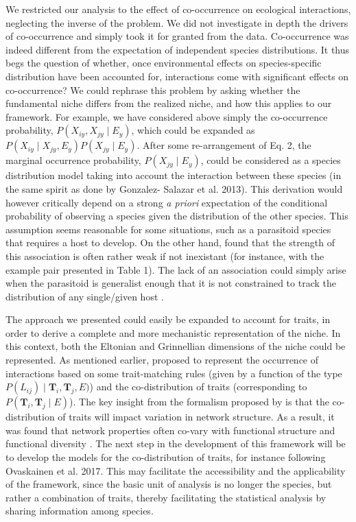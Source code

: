 \documentclass[12pt]{article}
\begin{document}
We restricted our analysis to the effect of co-occurrence on ecological
interactions, neglecting the inverse of the problem. We did not investigate in
depth the drivers of co-occurrence and simply took it for granted from the
data. Co-occurrence was indeed different from the expectation of independent
species distributions. It thus begs the question of whether, once
environmental effects on species-specific distribution have been accounted
for, interactions come with significant effects on co-occurrence? We could
rephrase this problem by asking whether the fundamental niche differs from the
realized niche, and how this applies to our framework. For example, we have
considered above simply the co-occurrence probability, $P(X_{iy},X_{jy}\mid E_y)$,
which could be expanded as $P(X_{iy}\mid X_{jy},E_y) P(X_{jy}\mid  E_y )$. After some
re-arrangement of Eq. 2, the marginal occurrence probability, $P(X_{jy}\mid E_y
)$, could be considered as a species distribution model taking into account
the interaction between these species (in the same spirit as done by Gonzalez-
Salazar et al. 2013). This derivation would however critically depend on a
strong \emph{a priori} expectation of the conditional probability of observing
a species given the distribution of the other species. This assumption seems
reasonable for some situations, such as a parasitoid species that requires a
host to develop. On the other hand, \citet{Cazelles2016b} found that the
strength of this association is often rather weak if not inexistant (for
instance, with the example pair presented in Table 1). The lack of an
association could simply arise when the parasitoid is generalist enough that
it is not constrained to track the distribution of any single/given host
\citep{Cazelles2015}.

The approach we presented could easily be expanded to account for traits, in
order to derive a complete and more mechanistic representation of the niche.
In this context, both the Eltonian and Grinnellian dimensions of the niche
could be represented. As mentioned earlier, \citealt{Gravel2016} proposed to
represent the occurrence of interactions based on some trait-matching rules
(given by a function of the type $P(L_{ij})\mid \mathbf{T}_i, \mathbf{T}_j, E)$)
and the co-distribution of traits (corresponding to $P(\mathbf{T}_i,
\mathbf{T}_j\mid E)$). The key  insight from the formalism proposed by
\citealt{Gravel2016} is that the co-distribution of traits will impact
variation in network structure. As a result, it was found that network
properties often co-vary with functional structure and functional diversity
\citealp{Laigle2018}. The next step in the development of this framework will
be to develop the models for the co-distribution of traits, for instance
following Ovaskainen et al. 2017. This may facilitate the accessibility and
the applicability of the framework, since the basic unit of analysis is no
longer the species, but rather a combination of traits, thereby facilitating
the statistical analysis by sharing information among species.
\end{document}
